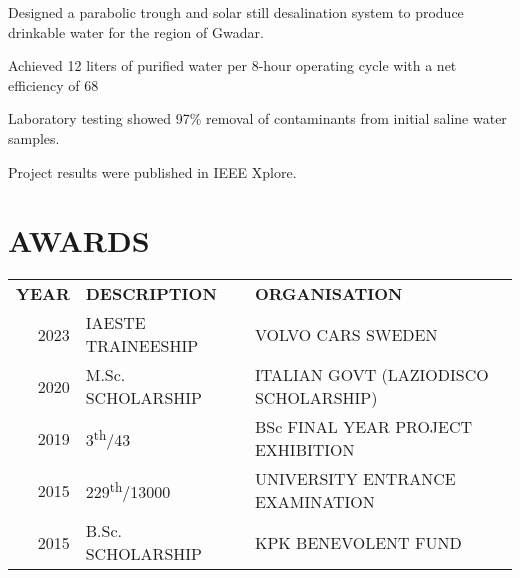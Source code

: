 \documentclass[]{hussain-resume-openfont}
\begin{document}
\begin{minipage}[t]{0.63\textwidth}
\begin{tightemize}
\justifying
    \item Designed a parabolic trough and solar still desalination system to produce drinkable water for the region of Gwadar.
    \item Achieved 12 liters of purified water per 8-hour operating cycle with a net efficiency of 68%
    \item Laboratory testing showed 97\% removal of contaminants from initial saline water samples.
    \item Project results were published in IEEE Xplore.
\end{tightemize}
\sectionsep

\section{AWARDS}
\begin{tabular}{rll}
\textbf{YEAR}     & \textbf{DESCRIPTION} & \textbf{ORGANISATION}\\
2023	     & IAESTE TRAINEESHIP   & \textcolor{awesome-red}{VOLVO CARS SWEDEN}\\
2020	     & M.Sc. SCHOLARSHIP  & \textcolor{awesome-red}{ITALIAN GOVT (LAZIODISCO SCHOLARSHIP)}\\
2019	     & 3\textsuperscript{th}/43  & \textcolor{awesome-red}{BSc FINAL YEAR PROJECT EXHIBITION}\\
2015     & 229\textsuperscript{th}/13000 & \textcolor{awesome-red}{UNIVERSITY ENTRANCE EXAMINATION}  \\
2015     & B.Sc. SCHOLARSHIP & \textcolor{awesome-red}{KPK BENEVOLENT FUND} \\
\end{tabular}


\end{minipage}
\hfill
\end{document}
